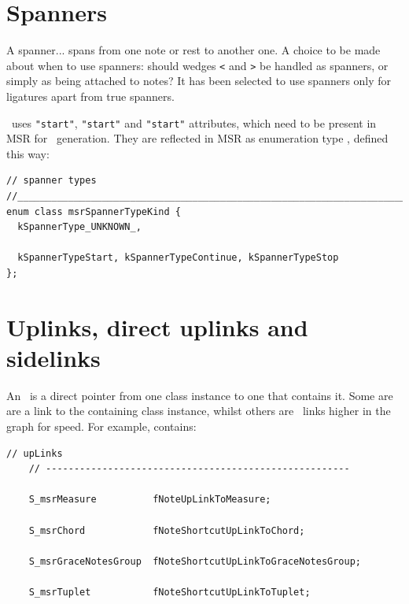 

\section{Spanners}\label{Spanners}

A spanner... spans from one note or rest to another one. A choice to be made about when to use spanners: should
wedges {\tt <} and {\tt >} be handled as spanners, or simply as being attached to notes? It has been selected to use spanners only for ligatures apart from true spanners.

\mxml\ uses {\tt "start"}, {\tt "start"} and {\tt "start"} attributes, which need to be present in MSR for \mxml\ generation. They are reflected in MSR as enumeration type , defined this way:
\begin{lstlisting}[language=CPlusPlus]
// spanner types
//______________________________________________________________________________
enum class msrSpannerTypeKind {
  kSpannerType_UNKNOWN_,

  kSpannerTypeStart, kSpannerTypeContinue, kSpannerTypeStop
};
\end{lstlisting}


\section{Uplinks, direct uplinks and sidelinks}\label{Uplinks, direct uplinks and sidelinks}

An \upLink\ is a direct pointer from one class instance to one that contains it. Some are are a link to the containing class instance, whilst others are \shortcut\ links higher in the graph for speed. For example,  contains:
\begin{lstlisting}[language=CPlusPlus]
    // upLinks
    // ------------------------------------------------------

    S_msrMeasure          fNoteUpLinkToMeasure;

    S_msrChord            fNoteShortcutUpLinkToChord;

    S_msrGraceNotesGroup  fNoteShortcutUpLinkToGraceNotesGroup;

    S_msrTuplet           fNoteShortcutUpLinkToTuplet;
\end{lstlisting}


